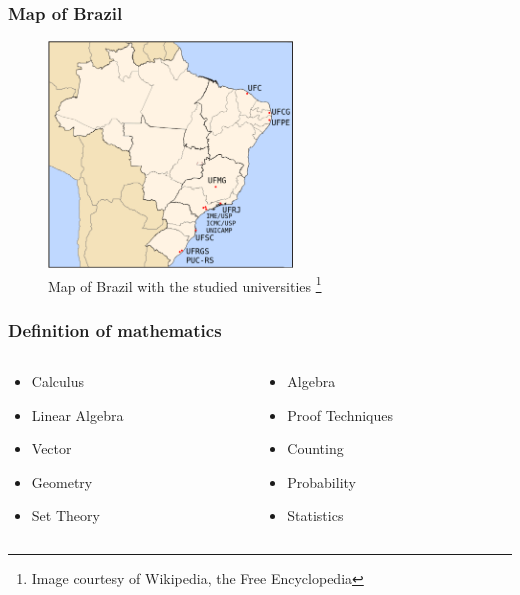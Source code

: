 \documentclass{beamer}
\begin{document}
\begin{frame}
\frametitle{Map of Brazil}
\begin{figure}[htp]
\begin{center}
  \includegraphics[height=6cm]{brazil_map.png}
  \caption[map]{Map of Brazil with the studied universities \footnote{\tiny
  Image courtesy of Wikipedia, the Free Encyclopedia}}
\end{center}
\end{figure}

\end{frame}

\begin{frame}
\frametitle{Definition of mathematics}
\begin{columns}
\begin{column}{0.5\textwidth}
	\begin{itemize}
		\item Calculus
		\item Linear Algebra
		\item Vector
		\item Geometry
		\item Set Theory
	\end{itemize}
\end{column}
\begin{column}{0.5\textwidth}
	\begin{itemize}
		\item Algebra
		\item Proof Techniques
		\item Counting
		\item Probability
		\item Statistics
	\end{itemize}
\end{column}
\end{columns}

\end{frame}
\end{document}

